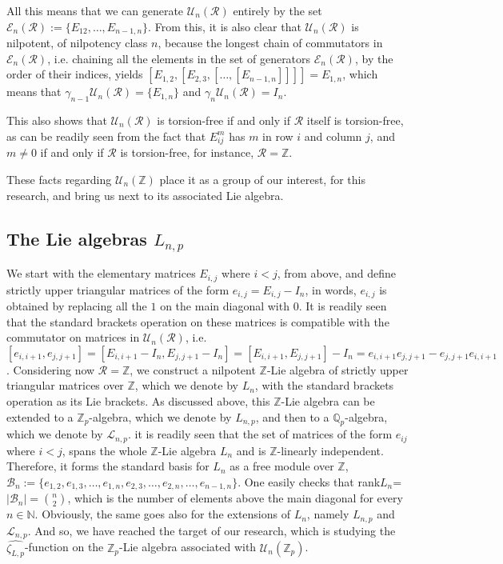 \documentclass[12pt]{article}
\begin{document}
All this means that we can generate $\mathcal{U}_n(\mathcal{R})$ entirely by the set $\mathcal{E}_n(\mathcal{R}):=\{E_{12},\dots,E_{n-1,n}\}$. From this, it is also clear that $\mathcal{U}_n(\mathcal{R})$ is nilpotent, of nilpotency class $n$, because the longest chain of commutators in $\mathcal{E}_n(\mathcal{R})$, i.e. chaining all the elements in the set of generators $\mathcal{E}_n(\mathcal{R})$, by the order of their indices, yields $[E_{1,2},[E_{2,3},[\dots,[E_{n-1,n}]]]]=E_{1,n}$, which means that $\gamma_{n-1}\mathcal{U}_n(\mathcal{R})=\{E_{1,n}\}$ and $\gamma_n \mathcal{U}_n(\mathcal{R})=I_n$.\par
This also shows that $\mathcal{U}_n(\mathcal{R})$ is torsion-free if and only if $\mathcal{R}$ itself is torsion-free, as can be readily seen from the fact that $E_{ij}^m$ has $m$ in row $i$ and column $j$, and $m\neq 0$ if and only if $\mathcal{R}$ is torsion-free, for instance, $\mathcal{R}=\mathbb{Z}$.\par
These facts regarding $\mathcal{U}_n(\mathbb{Z})$ place it as a group of our interest, for this research, and bring us next to its associated Lie algebra.
\subsection{The Lie algebras $L_{n,p}$}
We start with the elementary matrices $E_{i,j}$ where $i<j$, from above, and define strictly upper triangular matrices of the form $e_{i,j}=E_{i,j}-I_n$, in words, $e_{i,j}$ is obtained by replacing all the $1$ on the main diagonal with $0$. It is readily seen that the standard brackets operation on these matrices is compatible with the commutator on matrices in $\mathcal{U}_n(\mathcal{R})$, i.e. $[e_{i,i+1},e_{j,j+1}]=[E_{i,i+1}-I_n,E_{j,j+1}-I_n]=[E_{i,i+1},E_{j,j+1}]-I_n=e_{i,i+1}e_{j,j+1}-e_{j,j+1}e_{i,i+1}$. Considering now $\mathcal{R}=\mathbb{Z}$, we construct a nilpotent $\mathbb{Z}$-Lie algebra of strictly upper triangular matrices over $\mathbb{Z}$, which we denote by $L_n$, with the standard brackets operation as its Lie brackets. As discussed above, this $\mathbb{Z}$-Lie algebra can be extended to a $\mathbb{Z}_p$-algebra, which we denote by $L_{n,p}$, and then to a $\mathbb{Q}_p$-algebra, which we denote by $\mathcal{L}_{n,p}$.
it is readily seen that the set of matrices of the form $e_{ij}$ where $i<j$, spans the whole $\mathbb{Z}$-Lie algebra $L_n$ and is $\mathbb{Z}$-linearly independent. Therefore, it forms the standard basis for $L_n$ as a free module over $\mathbb{Z}$, $\mathcal{B}_n:=\{e_{1,2},e_{1,3},\dots,e_{1,n},e_{2,3},\dots,e_{2,n},\dots,e_{n-1,n}\}$. One easily checks that rank$L_n$=$|\mathcal{B}_n|=\binom{n}{2}$, which is the number of elements above the main diagonal for every $n\in\mathbb{N}$. Obviously, the same goes also for the extensions of $L_n$, namely $L_{n,p}$ and $\mathcal{L}_{n,p}$. And so, we have reached the target of our research, which is studying the $\hat{\zeta_{L,p}}$-function on the $\mathbb{Z}_p$-Lie algebra associated with $\mathcal{U}_n(\mathbb{Z}_p)$.
\end{document}
